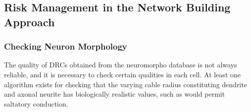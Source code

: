 \documentclass[a4paper,11pt]{article}
\begin{document}
%
%
%
%
%    
%


\subsection{Risk Management in the Network Building Approach}

\subsubsection{Checking Neuron Morphology}
The quality of DRCs obtained from the neuromorpho database is not always reliable, and it is necessary to check certain qualities in each cell. At least one algorithm exists for checking that the varying cable radius constituting dendrite and axonal neurite has biologically realistic values, such as would permit saltatory conduction. 
\end{document}
